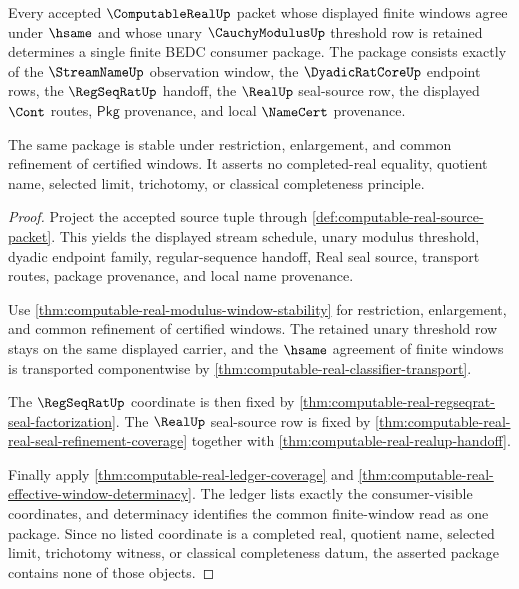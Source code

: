 \begin{theorem}
\label{thm:computable-real-effective-regseqrat-modulus-package}
Every accepted $\ComputableRealUp$ packet whose displayed finite windows agree
under $\hsame$ and whose unary $\CauchyModulusUp$ threshold row is retained
determines a single finite BEDC consumer package. The package consists exactly
of the $\StreamNameUp$ observation window, the $\DyadicRatCoreUp$ endpoint
rows, the $\RegSeqRatUp$ handoff, the $\RealUp$ seal-source row, the displayed
$\Cont$ routes, $\mathsf{Pkg}$ provenance, and local $\NameCert$ provenance.

The same package is stable under restriction, enlargement, and common
refinement of certified windows. It asserts no completed-real equality,
quotient name, selected limit, trichotomy, or classical completeness
principle.
\end{theorem}
\begin{proof}
Project the accepted source tuple through
\autoref{def:computable-real-source-packet}. This yields the displayed stream
schedule, unary modulus threshold, dyadic endpoint family, regular-sequence
handoff, Real seal source, transport routes, package provenance, and local
name provenance.

Use \autoref{thm:computable-real-modulus-window-stability} for restriction,
enlargement, and common refinement of certified windows. The retained unary
threshold row stays on the same displayed carrier, and the $\hsame$ agreement
of finite windows is transported componentwise by
\autoref{thm:computable-real-classifier-transport}.

The $\RegSeqRatUp$ coordinate is then fixed by
\autoref{thm:computable-real-regseqrat-seal-factorization}. The $\RealUp$
seal-source row is fixed by
\autoref{thm:computable-real-real-seal-refinement-coverage} together with
\autoref{thm:computable-real-realup-handoff}.

Finally apply \autoref{thm:computable-real-ledger-coverage} and
\autoref{thm:computable-real-effective-window-determinacy}. The ledger lists
exactly the consumer-visible coordinates, and determinacy identifies the
common finite-window read as one package. Since no listed coordinate is a
completed real, quotient name, selected limit, trichotomy witness, or
classical completeness datum, the asserted package contains none of those
objects.
\end{proof}


